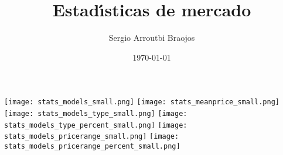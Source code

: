 \documentclass[11pt]{article}
\title{\textbf{Estad\'\i{}sticas de mercado}}
\author{Sergio Arroutbi Braojos}
\date{\today}
\begin{document}
\begin{landscape}
\texttt{[image: stats\_models\_small.png]}
\pagebreak
\texttt{[image: stats\_meanprice\_small.png]}
\pagebreak
\texttt{[image: stats\_models\_type\_small.png]}
\pagebreak
\texttt{[image: stats\_models\_type\_percent\_small.png]}
\pagebreak
\texttt{[image: stats\_models\_pricerange\_small.png]}
\pagebreak
\texttt{[image: stats\_models\_pricerange\_percent\_small.png]}
\end{landscape}
\end{document}
